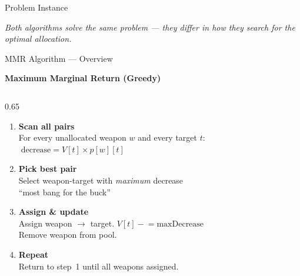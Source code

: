 \documentclass[aspectratio=169]{beamer}
\begin{document}
\begin{frame}{Problem Instance}
  \vspace{0.25cm}
  \colorbox{navymid}{\begin{minipage}{\linewidth}
    {\color{graylt}\small\itshape
     Both algorithms solve the same problem ---
     they differ in \emph{how} they search for the optimal allocation.}
  \end{minipage}}
\end{frame}

\begin{frame}{MMR Algorithm --- Overview}

  {\large\bfseries\color{navy} Maximum Marginal Return (Greedy)}\\[3pt]

  \begin{columns}[T]
    \begin{column}{0.65\textwidth}
      \begin{enumerate}\itemsep10pt
        \item \textbf{Scan all pairs}\\[2pt]
          {\small For every unallocated weapon $w$ and every target $t$:}\\[2pt]
          {\small\colorbox{navymid}{\color{teallt}
            $\;\text{decrease} = V[t] \times p[w][t]\;$}}

        \item \textbf{Pick best pair}\\[2pt]
          {\small Select weapon-target with \emph{maximum} decrease}\\
          {\small\color{mygray} ``most bang for the buck''}

        \item \textbf{Assign \& update}\\[2pt]
          {\small Assign weapon $\to$ target.\quad
            $V[t] \mathrel{-}= \text{maxDecrease}$}\\
          {\small Remove weapon from pool.}

        \item \textbf{Repeat}\\[2pt]
          {\small Return to step~1 until all weapons assigned.}
      \end{enumerate}
    \end{column}


\end{columns}
\end{frame}
\end{document}
